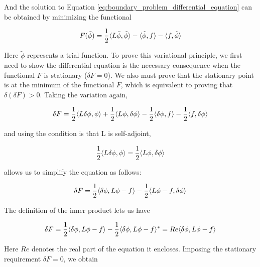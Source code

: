 \documentclass[a4paper,12pt]{report}
\begin{document}
And the solution to Equation \ref{eq:boundary_problem_differential_equation}
can be obtained by minimizing the functional

\begin{equation}
  F(\tilde{\phi}) = \frac{1}{2}\langle L \tilde{\phi}, \tilde{\phi}\rangle \\
  - \langle \tilde{\phi}, f \rangle - \langle f, \tilde{\phi} \rangle
\end{equation}

Here $\tilde{\phi}$ represents a trial function.
To prove this variational principle,
we first need to show the differential equation is the necessary consequence when the functional $F$ is stationary
($\delta F = 0$).
We also must prove that the stationary point is at the minimum of the functional $F$,
which is equivalent to proving that $\delta(\delta F) > 0$.
Taking the variation again,

\begin{equation}
  \delta F = \frac{1}{2}\langle L\delta\phi,\phi \rangle + \frac{1}{2}\langle L\phi,\delta\phi \rangle \\
              - \frac{1}{2}\langle \delta\phi,f \rangle - \frac{1}{2}\langle f, \delta\phi \rangle
\end{equation}

and using the condition is that L is self-adjoint,

\begin{equation}
  \frac{1}{2}\langle L\delta\phi,\phi \rangle = \frac{1}{2}\langle L\phi,\delta\phi \rangle
\end{equation}

allows us to simplify the equation as follows:

\begin{equation}
  \delta F = \frac{1}{2}\langle \delta\phi, L\phi - f \rangle \\
  - \frac{1}{2}\langle L\phi - f, \delta\phi \rangle
\end{equation}

The definition of the inner product lets us have

\begin{equation}
  \delta F = \frac{1}{2}\langle \delta\phi, L\phi - f \rangle \\
  - \frac{1}{2}\langle \delta\phi, L\phi - f \rangle^* \\
  = Re\langle \delta\phi, L\phi-f\rangle
\end{equation}

Here $Re$ denotes the real part of the equation it encloses. 
Imposing the stationary requirement $\delta F = 0$,
we obtain
\end{document}
